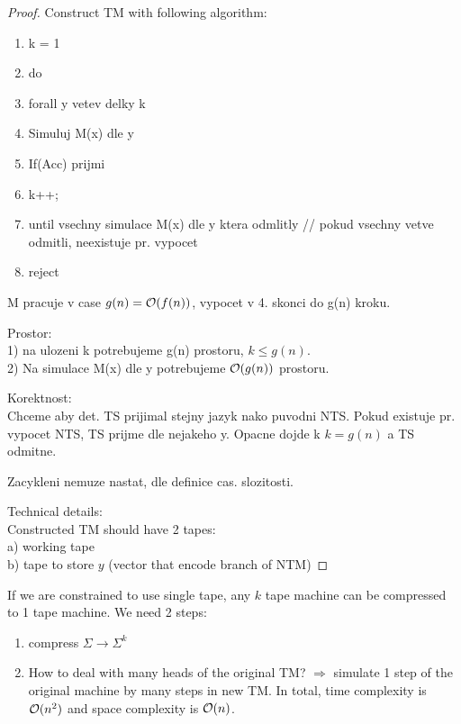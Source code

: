 \begin{proof}
Construct TM with following algorithm:
\begin{enumerate}
	\item k = 1
	\item do
	\item forall y vetev delky k
	\item Simuluj M(x) dle y
	\item If(Acc) prijmi
	\item k++;
	\item until vsechny simulace M(x) dle y ktera odmlitly
		// pokud vsechny vetve odmitli, neexistuje pr. vypocet
	\item reject
\end{enumerate}

M pracuje v case $g(n) = \mathcal{O}(f(n))$, vypocet v 4. skonci do g(n) kroku.

Prostor: \\
1) na ulozeni k potrebujeme g(n) prostoru, $ k \leq g(n) $. \\
2) Na simulace M(x) dle y potrebujeme $\mathcal{O}(g(n))$ prostoru.

Korektnost: \\
Chceme aby det. TS prijimal stejny jazyk nako puvodni NTS. Pokud existuje pr. vypocet NTS, TS prijme dle nejakeho y. Opacne dojde k $ k = g(n)$ a TS odmitne.

Zacykleni nemuze nastat, dle definice cas. slozitosti.

Technical details:\\
Constructed TM should have 2 tapes:\\
a) working tape\\
b) tape to store $y$ (vector that encode branch of NTM)
\end{proof}

\begin{note}
	If we are constrained to use single tape, any $k$ tape machine can be compressed to 1 tape machine. We need 2 steps:

\begin{enumerate}
	\item compress $\Sigma \to \Sigma^k$
	\item How to deal with many heads of the original TM? $\Rightarrow$ simulate 1 step of the original machine by many steps in new TM.
		In total, time complexity is $\mathcal{O}(n^2)$ and space complexity is $\mathcal{O}(n)$.
\end{enumerate}
\end{note}

